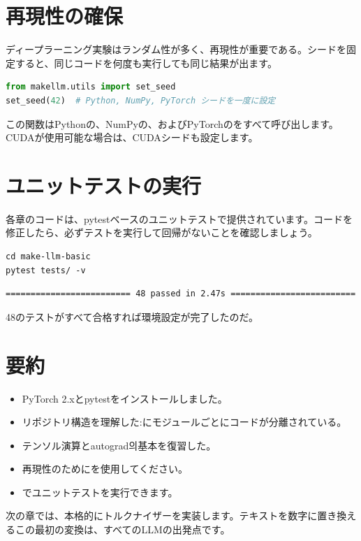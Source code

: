 \section{再現性の確保}

ディープラーニング実験はランダム性が多く、再現性が重要である。シードを固定すると、同じコードを何度も実行しても同じ結果が出ます。

\begin{lstlisting}[language=Python]
from makellm.utils import set_seed
set_seed(42)  # Python, NumPy, PyTorch シードを一度に設定
\end{lstlisting}

この関数はPythonの、NumPyの、およびPyTorchのをすべて呼び出します。 CUDAが使用可能な場合は、CUDAシードも設定します。

\section{ユニットテストの実行}

各章のコードは、pytestベースのユニットテストで提供されています。コードを修正したら、必ずテストを実行して回帰がないことを確認しましょう。

\begin{lstlisting}[style=bashstyle]
cd make-llm-basic
pytest tests/ -v
\end{lstlisting}

\begin{lstlisting}[style=bashstyle, basicstyle=\ttfamily\small]
========================= 48 passed in 2.47s =========================
\end{lstlisting}

48のテストがすべて合格すれば環境設定が完了したのだ。

\section{要約}

\begin{itemize}
\item PyTorch 2.xとpytestをインストールしました。
\item リポジトリ構造を理解した:にモジュールごとにコードが分離されている。
\item テンソル演算とautograd의基本を復習した。
\item 再現性のためにを使用してください。
\item {}でユニットテストを実行できます。
\end{itemize}

次の章では、本格的にトルクナイザーを実装します。テキストを数字に置き換えるこの最初の変換は、すべてのLLMの出発点です。
